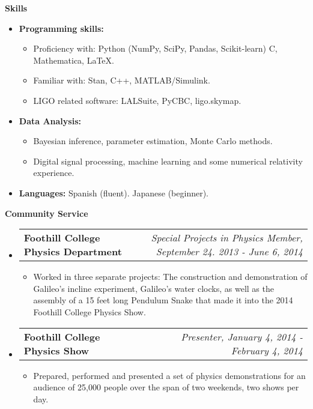 \documentclass[letterpaper,10pt]{article}
\makeatletter
\newcommand{\resitem}[1]{\item #1 \vspace{-2pt}}
\newcommand{\resheading}[1]{{\large \colorbox{mygrey}{\begin{minipage}{\textwidth}{\textbf{#1 \vphantom{p\^{E}}}}\end{minipage}}}}
\newcommand{\ressubheading}[4]{
\begin{tabular*}{7.0in}{l@{\extracolsep{\fill}}r}
		\textbf{#1} & \textit{#4} \\
\end{tabular*}\vspace{-6pt}}
\makeatother
\begin{document}
\resheading{Skills}
\begin{itemize}
\item \textbf{Programming skills:}
	\begin{itemize}
	\item Proficiency with: Python (NumPy, SciPy, Pandas, Scikit-learn) C, Mathematica, LaTeX.
	\item Familiar with: Stan, C++, MATLAB/Simulink.
	\item LIGO related software: LALSuite, PyCBC, ligo.skymap.
	\end{itemize}
\item \textbf{Data Analysis:}
	\begin{itemize}
		\item Bayesian inference, parameter estimation, Monte Carlo methods.
		\item Digital signal processing, machine learning and some numerical relativity experience.
	\end{itemize}
\item \textbf{Languages:} Spanish (fluent). Japanese (beginner).
\end{itemize}

\resheading{Community Service}
\begin{itemize}
\item
	\ressubheading{Foothill College Physics Department}{Los Altos Hills, CA}{Special Projects in Physics Member}{Special Projects in Physics Member, September 24. 2013 - June 6, 2014}
	\begin{itemize}
		\resitem{Worked in three separate projects: The construction and demonstration of Galileo’s incline experiment, Galileo’s water clocks, as well as the assembly of a 15 feet long Pendulum Snake that made it into the 2014 Foothill College Physics Show.}
	\end{itemize}
\item
	\ressubheading{Foothill College Physics Show}{Los Altos Hills, CA}{Presenter}{Presenter, January 4, 2014 - February 4, 2014 }
	\begin{itemize}
		\resitem{Prepared, performed and presented a set of physics demonstrations for an audience of 25,000 people over the span of two weekends, two shows per day.}
	\end{itemize}
\end{itemize}
\end{document}
